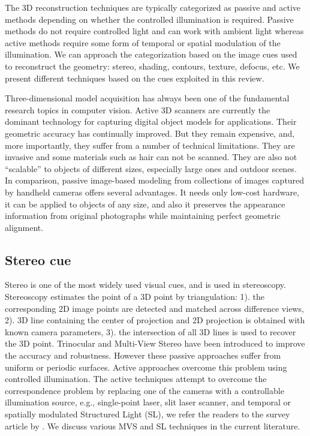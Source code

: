 The 3D reconstruction techniques are typically categorized as passive and active methods depending on whether the controlled illumination is required. Passive methods do not require controlled light and can work with ambient light whereas active methods require some form of temporal or spatial modulation of the illumination. We can approach the categorization based on the image cues used to reconstruct the geometry: stereo, shading, contours, texture, defocus, etc. We present different techniques based on the cues exploited in this review.

Three-dimensional model acquisition has always been one of the fundamental research topics in computer vision. Active 3D scanners are currently the dominant technology for capturing digital object models for applications. Their geometric accuracy has continually improved. But they remain expensive, and, more importantly, they suffer from a number of technical limitations. They are invasive and some materials such as hair can not be scanned. They are also not ``scalable'' to objects of different sizes, especially large ones and outdoor scenes. In comparison, passive image-based modeling from collections of images captured by handheld cameras offers several advantages. It needs only low-cost hardware, it can be applied to objects of any size, and also it preserves the appearance information from original photographs while maintaining perfect geometric alignment.

\subsection{Stereo cue}
Stereo is one of the most widely used visual cues, and is used in stereoscopy. Stereoscopy estimates the point of a 3D point by triangulation: 1). the corresponding 2D image points are detected and matched across difference views, 2). 3D line containing the center of projection and 2D projection is obtained with known camera parameters, 3). the intersection of all 3D lines is used to recover the 3D point. Trinocular and Multi-View Stereo have been introduced to improve the accuracy and robustness. However these passive approaches suffer from uniform or periodic surfaces. Active approaches overcome this problem using controlled illumination. The active techniques attempt to overcome the correspondence problem by replacing one of the cameras with a controllable illumination source, e.g., single-point laser, slit laser scanner, and temporal or spatially modulated Structured Light (SL), we refer the readers to the survey article by \citeauthor{blais2004review}. We discuss various MVS and SL techniques in the current literature.

